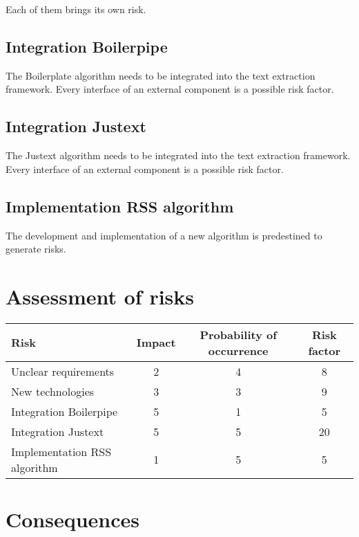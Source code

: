 Each of them brings its own risk.

\subsection{Integration Boilerpipe}

The Boilerplate algorithm needs to be integrated into the text extraction framework. Every interface of an external component is a possible risk factor.

\subsection{Integration Justext}


The Justext algorithm needs to be integrated into the text extraction framework. Every interface of an external component is a possible risk factor.


\subsection{Implementation RSS algorithm}

The development and implementation of a new algorithm is predestined to generate risks.

\section{Assessment of risks}

\begin{table}[h]
\begin{tabular}{|l|c|c|c|}
\hline
\textbf{Risk} & \textbf{Impact} & \textbf{Probability of occurrence} & \textbf{Risk factor} \\ \hline
Unclear requirements & 2 & 4 & 8\\ \hline
New technologies & 3 & 3 & 9 \\ \hline
Integration Boilerpipe & 5 & 1 & 5\\ \hline
Integration Justext & 5 & 5 & 20 \\ \hline
Implementation RSS algorithm & 1 & 5 & 5\\ \hline
\end{tabular}
\end{table}

\section{Consequences}



